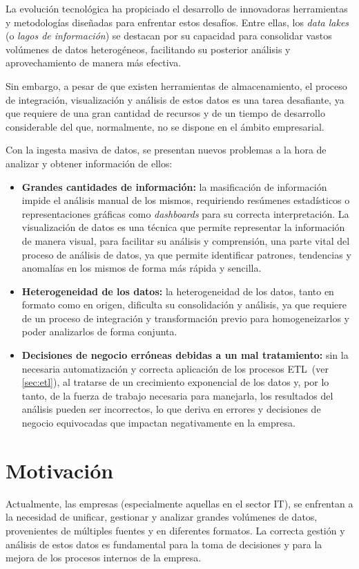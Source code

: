 La evolución tecnológica ha propiciado el desarrollo de innovadoras herramientas
y metodologías diseñadas para enfrentar estos desafíos. Entre ellas, los
\textit{data lakes} (o \emph{lagos de información}) se destacan por su capacidad
para consolidar vastos volúmenes de datos heterogéneos, facilitando su posterior
análisis y aprovechamiento de manera más efectiva.

Sin embargo, a pesar de que existen herramientas de almacenamiento, el proceso
de integración, visualización y análisis de estos datos es una tarea desafiante,
ya que requiere de una gran cantidad de recursos y de un tiempo de desarrollo
considerable del que, normalmente, no se dispone en el ámbito empresarial.

Con la ingesta masiva de datos, se presentan nuevos problemas a la hora de
analizar y obtener información de ellos:

\begin{itemize}
	\item \textbf{Grandes cantidades de información:}
		la masificación de información impide el análisis manual de los
		mismos, requiriendo resúmenes estadísticos o representaciones gráficas
		como \textit{dashboards} para su correcta interpretación.
		La visualización de datos es una técnica que permite representar la
		información de manera visual, para facilitar su análisis y comprensión,
		una parte vital del proceso de análisis de datos, ya que permite
		identificar patrones, tendencias y anomalías en los mismos de forma más
		rápida y sencilla.
	\item \textbf{Heterogeneidad de los datos:}
		la heterogeneidad de los datos, tanto en formato como en origen,
		dificulta su consolidación y análisis, ya que requiere de un proceso de
		integración y transformación previo para homogeneizarlos y poder
		analizarlos de forma conjunta.
	\item \textbf{Decisiones de negocio erróneas debidas a un mal tratamiento:}
		sin la necesaria automatización y correcta aplicación de los procesos
		ETL~(ver \ref{sec:etl}), al tratarse de un crecimiento exponencial de
		los datos y, por lo tanto, de la fuerza de trabajo necesaria para
		manejarla, los resultados del análisis pueden ser incorrectos, lo que
		deriva en errores y decisiones de negocio equivocadas que impactan
		negativamente en la empresa.
\end{itemize}

\newpage{}
\section{Motivación}\label{sec:motivacion}
Actualmente, las empresas (especialmente aquellas en el sector IT), se enfrentan
a la necesidad de unificar, gestionar y analizar grandes volúmenes de datos,
provenientes de múltiples fuentes y en diferentes formatos. La correcta gestión
y análisis de estos datos es fundamental para la toma de decisiones y para la
mejora de los procesos internos de la empresa.

